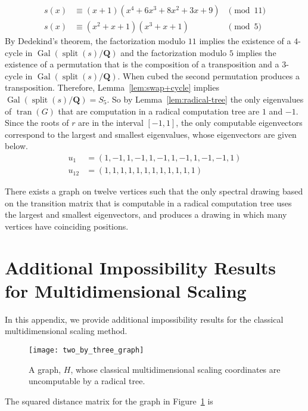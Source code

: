 \documentclass[oribibl,10pt]{llncs}
\newcommand{\rationals}{\mathbf{Q}}
\DeclareMathOperator{\Gal}{Gal}
\DeclareMathOperator{\splitting}{split}
\DeclareMathOperator{\transition}{tran}
\begin{document}
\begin{appendix}
\begin{align*}
s(x) &\equiv (x + 1)  (x^4 + 6x^3 + 8x^2 + 3x + 9) &\pmod{11}\\
s(x) &\equiv (x^2 + x + 1)  (x^3 + x + 1) &\pmod{5}
\end{align*}
By Dedekind's theorem, the factorization modulo $11$ implies the existence of a $4$-cycle in $\Gal(\splitting(s)/\rationals)$ and the factorization modulo $5$ implies the existence of a permutation that is the composition of a transposition and a $3$-cycle in $\Gal(\splitting(s)/\rationals)$. When cubed the second permutation produces a transposition. Therefore, Lemma~\ref{lem:swap+cycle} implies $\Gal(\splitting(s)/\rationals) = S_5$. So by Lemma~\ref{lem:radical-tree} the only eigenvalues of $\transition(G)$ that are computation in a radical computation tree are $1$ and $-1$. Since the roots of $r$ are in the interval $[-1,1]$, the only computable eigenvectors correspond to the largest and smallest eigenvalues, whose eigenvectors are given below.
\begin{align*}
u_1 &= (1, -1, 1, -1, 1, -1, 1, -1, 1, -1, -1, 1) \\
u_{12} &= (1, 1, 1, 1, 1, 1, 1, 1, 1, 1, 1, 1)
\end{align*}

\begin{theorem}
There exists a graph on twelve vertices such that the only spectral drawing based on the transition matrix that is computable in a radical computation tree uses the largest and smallest eigenvectors, and produces a drawing in which many vertices have coinciding positions.
\end{theorem}

\clearpage

\section{Additional Impossibility Results for Multidimensional Scaling}
\label{app:mds}

In this appendix, we provide additional impossibility results for the classical multidimensional scaling method.

\begin{figure}[hbt]
\centering
\texttt{[image: two\_by\_three\_graph]}
\caption{A graph, $H$, whose classical multidimensional scaling coordinates are uncomputable by a radical tree.}
\label{fig:2-by-3-graph}
\end{figure}

The squared distance matrix for the graph in Figure~\ref{fig:2-by-3-graph} is 


\end{appendix}
\end{document}
